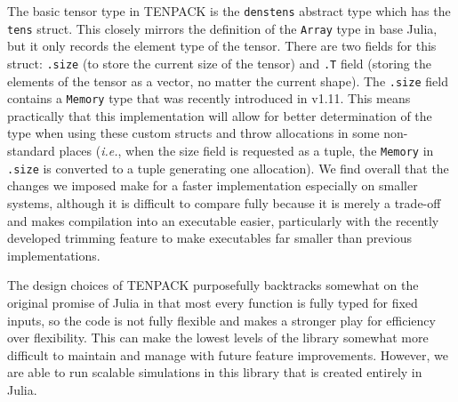 \documentclass{juliacon}
\begin{document}
The basic tensor type in TENPACK is the {\tt denstens} abstract type which has the {\tt tens} struct. This closely mirrors the definition of the {\tt Array} type in base Julia, but it only records the element type of the tensor. There are two fields for this struct: {\tt .size} (to store the current size of the tensor) and {\tt .T} field (storing the elements of the tensor as a vector, no matter the current shape). The {\tt .size} field contains a {\tt Memory} type that was recently introduced in v1.11. This means practically that this implementation will allow for better determination of the type when using these custom structs and throw allocations in some non-standard places ({\it i.e.}, when the size field is requested as a tuple, the {\tt Memory} in {\tt .size} is converted to a tuple generating one allocation). We find overall that the changes we imposed make for a faster implementation especially on smaller systems, although it is difficult to compare fully because it is merely a trade-off and makes compilation into an executable easier, particularly with the recently developed trimming feature to make executables far smaller than previous implementations.

The design choices of TENPACK purposefully backtracks somewhat on the original promise of Julia in that most every function is fully typed for fixed inputs, so the code is not fully flexible and makes a stronger play for efficiency over flexibility. This can make the lowest levels of the library somewhat more difficult to maintain and manage with future feature improvements. However, we are able to run scalable simulations in this library that is created entirely in Julia.
\end{document}
